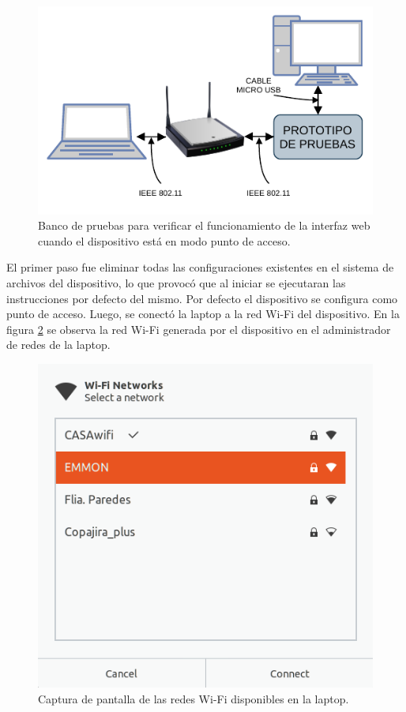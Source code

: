 \begin{figure}[ht]
	\centering
	\includegraphics[scale=1.1]{./Figures/test_interface_bank.pdf}
	\caption{Banco de pruebas para verificar el funcionamiento de la interfaz web cuando el dispositivo está en modo punto de acceso.}
	\label{fig:testInterface}
\end{figure}

El primer paso fue eliminar todas las configuraciones existentes en el sistema de archivos del dispositivo, lo que provocó que al iniciar se ejecutaran las instrucciones por defecto del mismo. Por defecto el dispositivo se configura como punto de acceso. Luego, se conectó la laptop a la red Wi-Fi del dispositivo. En la figura \ref{fig:testScreenNet} se observa la red Wi-Fi generada por el dispositivo en el administrador de redes de la laptop. 

\begin{figure}[ht]
	\centering
	\includegraphics[scale=0.53]{./Figures/test_interface_nets.png}
	\caption{Captura de pantalla de las redes Wi-Fi disponibles en la laptop.}
	\label{fig:testScreenNet}
\end{figure}

